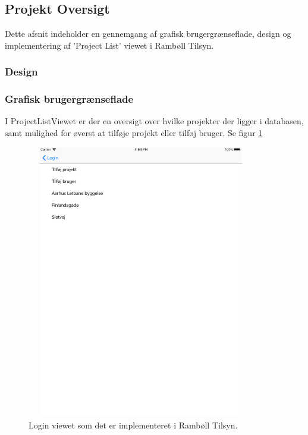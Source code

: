\subsection{Projekt Oversigt} \label{sec:ProjectList}
Dette afsnit indeholder en gennemgang af grafisk brugergrænseflade, design og implementering af 'Project List' viewet i Rambøll Tilsyn.

\subsubsection{Design}

\clearpage

\subsubsection{Grafisk brugergrænseflade}
I ProjectListViewet er der en oversigt over hvilke projekter der ligger i databasen, samt mulighed for øverst at tilføje projekt eller tilføj bruger. Se figur \ref{fig:ProjectListView}
\begin{figure}[H] %
	\centering
	\includegraphics[height=12cm, width=10cm]{../ArkitekturDesign/Design/ProjectList/ProjectList}
	\caption{Login viewet som det er implementeret i Rambøll Tilsyn.}
	\label{fig:ProjectListView}
\end{figure}

